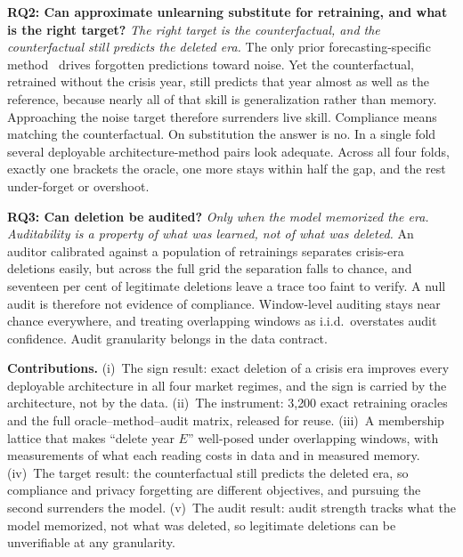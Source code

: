 \textbf{RQ2: Can approximate unlearning substitute for retraining,
and what is the right target?} \emph{The right target is the
counterfactual, and the counterfactual still predicts the deleted
era.} The only prior forecasting-specific
method~\cite{wang2026tsunlearn} drives forgotten predictions toward
noise. Yet the counterfactual, retrained without the crisis year,
still predicts that year almost as well as the reference, because
nearly all of that skill is generalization rather than memory.
Approaching the noise target therefore surrenders live skill.
Compliance means matching the counterfactual. On substitution the
answer is no. In a single fold several deployable
architecture-method pairs look adequate. Across all four folds,
exactly one brackets the oracle, one more stays within half the
gap, and the rest under-forget or overshoot.

\textbf{RQ3: Can deletion be audited?} \emph{Only when the model
memorized the era. Auditability is a property of what was learned, not
of what was deleted.} An auditor calibrated against a population of
retrainings separates crisis-era deletions easily, but across the
full grid the separation falls to chance, and seventeen per cent of
legitimate deletions leave a trace too faint to verify. A null
audit is therefore not evidence of compliance. Window-level
auditing stays near chance everywhere, and treating overlapping
windows as i.i.d.\ overstates audit confidence. Audit granularity
belongs in the data contract.

\textbf{Contributions.} (i)~The sign result: exact deletion of a
crisis era improves every deployable architecture in all four
market regimes, and the sign is carried by the architecture, not by
the data. (ii)~The instrument: 3{,}200 exact retraining oracles and
the full oracle--method--audit matrix, released for reuse. (iii)~A
membership lattice that makes ``delete year $E$'' well-posed under
overlapping windows, with measurements of what each reading costs
in data and in measured memory. (iv)~The target result: the
counterfactual still predicts the deleted era, so compliance and
privacy forgetting are different objectives, and pursuing the
second surrenders the model. (v)~The audit result: audit strength
tracks what the model memorized, not what was deleted, so
legitimate deletions can be unverifiable at any granularity.
